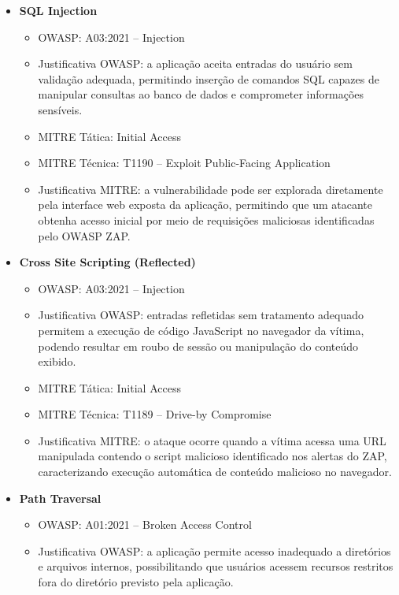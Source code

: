 \begin{itemize}
  \item \textbf{SQL Injection}
    \begin{itemize}
      \item OWASP: A03:2021 -- Injection
      \item Justificativa OWASP: a aplicação aceita entradas do usuário sem
        validação adequada, permitindo inserção de comandos SQL capazes de
        manipular consultas ao banco de dados e comprometer informações
        sensíveis.

      \item MITRE Tática: Initial Access
      \item MITRE Técnica: T1190 -- Exploit Public-Facing Application

      \item Justificativa MITRE: a vulnerabilidade pode ser explorada
        diretamente pela interface web exposta da aplicação, permitindo que um
        atacante obtenha acesso inicial por meio de requisições maliciosas
        identificadas pelo OWASP ZAP.
    \end{itemize}

  \item \textbf{Cross Site Scripting (Reflected)}
    \begin{itemize}
      \item OWASP: A03:2021 -- Injection
      \item Justificativa OWASP: entradas refletidas sem tratamento adequado
        permitem a execução de código JavaScript no navegador da vítima,
        podendo resultar em roubo de sessão ou manipulação do conteúdo exibido.

      \item MITRE Tática: Initial Access
      \item MITRE Técnica: T1189 -- Drive-by Compromise

      \item Justificativa MITRE: o ataque ocorre quando a vítima acessa uma URL
        manipulada contendo o script malicioso identificado nos alertas do ZAP,
        caracterizando execução automática de conteúdo malicioso no navegador.
    \end{itemize}

  \item \textbf{Path Traversal}
    \begin{itemize}
      \item OWASP: A01:2021 -- Broken Access Control
      \item Justificativa OWASP: a aplicação permite acesso inadequado a
        diretórios e arquivos internos, possibilitando que usuários acessem
        recursos restritos fora do diretório previsto pela aplicação.


\end{itemize}
\end{itemize}
